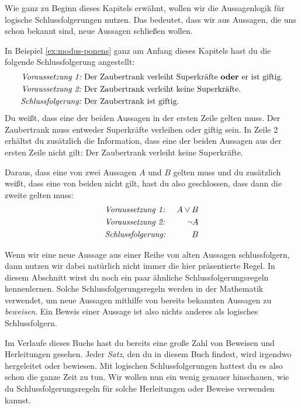 \documentclass[../../main.tex]{subfiles}
\begin{document}
Wie ganz zu Beginn dieses Kapitels erwähnt, wollen wir die Aussagenlogik für logische Schlussfolgerungen nutzen. Das bedeutet, dass wir aus Aussagen, die uns schon bekannt sind, neue Aussagen schließen wollen. 

\begin{example}{}
    In Beispiel \ref{ex:modus-ponens} ganz am Anfang dieses Kapitels hast du die folgende Schlussfolgerung angestellt:
    \begin{align*}
        \text{\emph{Voraussetzung~1:}}~&\text{Der~Zaubertrank~verleiht~Superkräfte~\textbf{oder}~er~ist~giftig}.\\
        \text{\emph{Voraussetzung~2:}}~&\text{Der~Zaubertrank~verleiht~keine~Superkräfte}.\\
        \text{\emph{Schlussfolgerung:}}~&\text{Der~Zaubertrank~ist~giftig}.
    \end{align*}
    Du weißt, dass eine der beiden Aussagen in der ersten Zeile gelten muss. Der Zaubertrank muss entweder Superkräfte verleihen oder giftig sein. In Zeile 2 erhältst du zusätzlich die Information, dass eine der beiden Aussagen aus der ersten Zeile nicht gilt: Der Zaubertrank verleiht keine Superkräfte.
\end{example}

Daraus, dass eine von zwei Aussagen $A$ und $B$ gelten muss und du zusätzlich weißt, dass eine von beiden nicht gilt, hast du also geschlossen, dass dann die zweite gelten muss:
\begin{align*}
    &\text{\emph{Voraussetzung~1:}}~&A\lor B\\
    &\text{\emph{Voraussetzung~2:}}~&\lnot A\\
    &\text{\emph{Schlussfolgerung:}}~&B
\end{align*}

Wenn wir eine neue Aussage aus einer Reihe von alten Aussagen schlussfolgern, dann nutzen wir dabei natürlich nicht immer die hier präsentierte Regel. In diesem Abschnitt wirst du noch ein paar ähnliche Schlussfolgerungsregeln kennenlernen. Solche Schlussfolgerungsregeln werden in der Mathematik verwendet, um neue Aussagen mithilfe von bereits bekannten Aussagen zu \emph{beweisen}. Ein Beweis einer Aussage ist also nichts anderes als logisches Schlussfolgern.

Im Verlaufe dieses Buchs hast du bereits eine große Zahl von Beweisen und Herleitungen gesehen. Jeder \emph{Satz}, den du in diesem Buch findest, wird irgendwo hergeleitet oder bewiesen. Mit logischen Schlussfolgerungen hattest du es also schon die ganze Zeit zu tun. Wir wollen nun ein wenig genauer hinschauen, wie du Schlussfolgerungsregeln für solche Herleitungen oder Beweise verwenden kannst.
\end{document}
